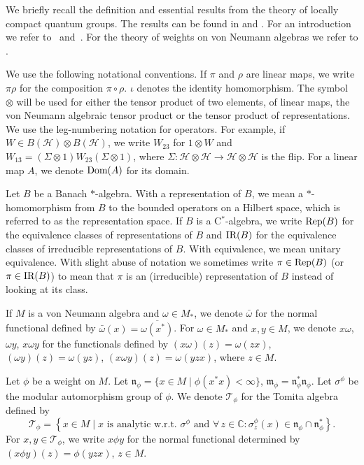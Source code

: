 \documentclass[pdftex]{sigma}
\numberwithin{equation}{section}
\theoremstyle{definition}
\newcommand{\Rep}{\text{\rm Rep}}
\newcommand{\cHil}{\mathcal{H}}
\newcommand{\Dom}{\text{\rm Dom}}
\newcommand{\IR}{\text{\rm IR}}
\begin{document}
We brief\/ly recall the def\/inition and essential results from the theory of locally compact quantum groups. The results can be found in \cite{KusVae, KusVaeII} and \cite{Kus}. For an introduction we refer to~\cite{Tim} and~\cite{KusLec}. For the theory of weights on von Neumann algebras we refer to \cite{TakII}.



We use the following notational conventions. If $\pi$ and $\rho$ are linear maps, we write $\pi\rho$ for the composition $\pi \circ \rho$. $\iota$ denotes the identity homomorphism. The symbol $\otimes$ will be used for either the tensor product of two elements, of linear maps, the von Neumann algebraic tensor product or the tensor product of representations. We use the leg-numbering notation for operators. For example, if $W \in B(\cHil) \otimes B(\cHil)$, we write $W_{23}$ for $1 \otimes W$ and $W_{13} = (\Sigma \otimes 1) W_{23}(\Sigma \otimes 1)$, where $\Sigma: \cHil \otimes \cHil \rightarrow \cHil \otimes \cHil$ is the f\/lip.  For a linear map $A$, we denote $\Dom(A)$ for its domain.

Let $B$ be a Banach $\ast$-algebra. With a representation of $B$, we mean a $\ast$-homomorphism from $B$ to the bounded operators on a Hilbert space, which is referred to as the representation space. If $B$ is a C$^\ast$-algebra, we write $\Rep(B)$ for the equivalence classes of representations of $B$ and $\IR(B)$ for the equivalence classes of irreducible representations of $B$. With equivalence, we mean unitary equivalence. With slight abuse of notation we sometimes write $\pi \in \Rep(B)$ (or $\pi \in \IR(B)$) to mean that $\pi$ is an (irreducible) representation of $B$ instead of looking at its class.

 If $M$ is a von Neumann algebra and $\omega \in M_\ast$, we denote $\bar{\omega}$ for the normal functional def\/ined by $\bar{\omega}(x) = \overline{\omega(x^\ast)}$. For $\omega \in M_\ast$ and $x,y \in M$, we denote $x\omega$, $\omega y$, $x \omega y$ for the functionals def\/ined by $(x\omega)(z) = \omega(zx)$, $(\omega y)(z) = \omega(yz)$, $(x\omega y)(z) = \omega(yzx)$, where $z \in M$.

 Let $\phi$ be a weight on  $M$. Let $\mathfrak{n}_\phi = \{ x
\in M \mid \phi(x^\ast x) < \infty \}$, $\mathfrak{m}_\phi =
\mathfrak{n}_\phi^\ast \mathfrak{n}_\phi$. Let $\sigma^\phi$ be the modular automorphism group of $\phi$. We denote $\mathcal{T}_\phi$ for the Tomita
algebra def\/ined by
\[
 \mathcal{T}_\phi = \left\{ x \in M \mid x \textrm{ is analytic w.r.t. } \sigma^\phi \textrm{ and } \forall \,z \in \mathbb{C}: \sigma_z^\phi(x) \in \mathfrak{n}_\phi \cap \mathfrak{n}_\phi^\ast \right\}.
\]
For $x,y \in \mathcal{T}_\phi$, we write $x \phi y$ for the normal functional determined by $(x \phi y)(z) = \phi(yzx)$, $z \in M$.
\end{document}

